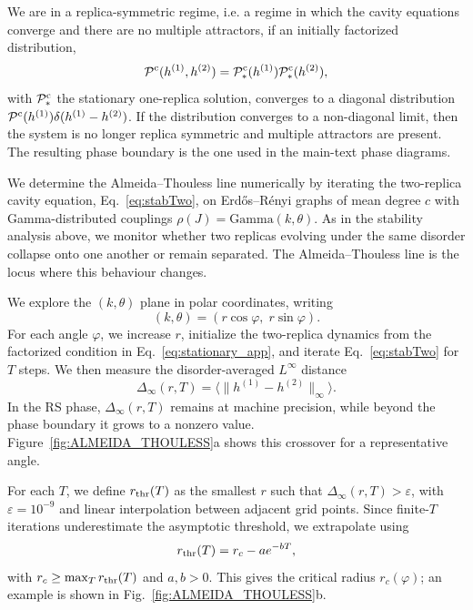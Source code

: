 \documentclass[11pt,a4paper]{article}
\begin{document}
We are in a replica-symmetric regime, i.e. a regime in which the cavity equations converge and there are no multiple attractors, if an initially factorized distribution,
\begin{equation}
    \mathcal{P}^{\rm c}(h^{(1)},h^{(2)}) = \mathcal{P}^{\rm c}_{\ast}(h^{(1)})\mathcal{P}^{\rm c}_{\ast}(h^{(2)}), \label{eq:stationary_app}
\end{equation}
with $\mathcal{P}^{\rm c}_{\ast}$ the stationary one-replica solution, converges to a diagonal distribution $\mathcal{P}^{\rm c}(h^{(1)})\delta(h^{(1)}-h^{(2)})$. If the distribution converges to a non-diagonal limit, then the system is no longer replica symmetric and multiple attractors are present. The resulting phase boundary is the one used in the main-text phase diagrams.


We determine the Almeida--Thouless line numerically by iterating the two-replica cavity equation, Eq.~\eqref{eq:stabTwo}, on Erd\H{o}s--R\'enyi graphs of mean degree $c$ with Gamma-distributed couplings $\rho(J)=\mathrm{Gamma}(k,\theta)$. As in the stability analysis above, we monitor whether two replicas evolving under the same disorder collapse onto one another or remain separated. The Almeida--Thouless line is the locus where this behaviour changes.

We explore the $(k,\theta)$ plane in polar coordinates, writing
\begin{equation}
    (k,\theta)=(r\cos\varphi,\;r\sin\varphi).
\end{equation}
For each angle $\varphi$, we increase $r$, initialize the two-replica dynamics from the factorized condition in Eq.~\eqref{eq:stationary_app}, and iterate Eq.~\eqref{eq:stabTwo} for $T$ steps. We then measure the disorder-averaged $L^\infty$ distance
\begin{equation}
    \Delta_\infty(r,T)
    =
    \bigl\langle
    \lVert h^{(1)}-h^{(2)}\rVert_\infty
    \bigr\rangle.
    \label{eq:linf_metric}
\end{equation}
In the RS phase, $\Delta_\infty(r,T)$ remains at machine precision, while beyond the phase boundary it grows to a nonzero value. Figure~\ref{fig:ALMEIDA_THOULESS}a shows this crossover for a representative angle.

For each $T$, we define $r_{\rm thr}(T)$ as the smallest $r$ such that $\Delta_\infty(r,T)>\varepsilon$, with $\varepsilon=10^{-9}$ and linear interpolation between adjacent grid points. Since finite-$T$ iterations underestimate the asymptotic threshold, we extrapolate using
\begin{equation}
    r_{\rm thr}(T)=r_c-ae^{-bT},
    \label{eq:exp_fit}
\end{equation}
with $r_c\geq \max_T r_{\rm thr}(T)$ and $a,b>0$. This gives the critical radius $r_c(\varphi)$; an example is shown in Fig.~\ref{fig:ALMEIDA_THOULESS}b.
\end{document}
